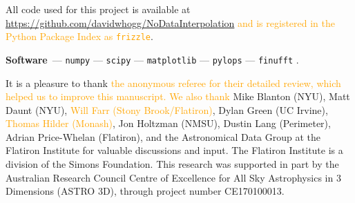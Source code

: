 \documentclass[modern, linenumbers]{aastex631}
\renewcommand{\paragraph}[1]{\medskip\par\noindent\textbf{#1}~---}
\newcommand{\modified}[1]{\textcolor{orange}{#1}}
\begin{document}
All code used for this project is available at \url{https://github.com/davidwhogg/NoDataInterpolation} \modified{and is registered in the Python Package Index as \texttt{frizzle}}.

\paragraph{Software}
\texttt{numpy} \citep{numpy} ---
\texttt{scipy} \citep{scipy} ---
\texttt{matplotlib} \citep{matplotlib} ---
\texttt{pylops} \citep{pylops} ---
\texttt{finufft} \citep{finufft}.

\begin{acknowledgments}
It is a pleasure to thank \modified{the anonymous referee for their detailed review, which helped us to improve this manuscript. We also thank}
    Mike Blanton (NYU),
    Matt Daunt (NYU),
    \modified{Will Farr (Stony Brook/Flatiron)},
    Dylan Green (UC Irvine),
    \modified{Thomas Hilder (Monash)},
    Jon Holtzman (NMSU),
    Dustin Lang (Perimeter),
    Adrian Price-Whelan (Flatiron),
and the Astronomical Data Group at the Flatiron Institute
for valuable discussions and input.
The Flatiron Institute is a division of the Simons Foundation.
This research was supported in part by the Australian Research Council Centre of Excellence for All Sky Astrophysics in 3 Dimensions (ASTRO 3D), through project number CE170100013.
\end{acknowledgments}
\end{document}
